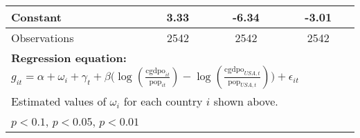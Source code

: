 \begin{sidewaystable}[htbp]
\begin{tabular}{l*{3}{c}}
Constant        &     3.33\sym{***}&    -6.34\sym{***}&    -3.01         \\
\midrule
Observations    &     2542         &     2542         &     2542         \\
\bottomrule
\multicolumn{4}{l}{\footnotesize \textbf{Regression equation:} \(g_{it} = \alpha  + \omega_i + \gamma_t + \beta \big(\log (\frac{\textrm{cgdpo}_{it}}{\textrm{pop}_{it}} ) - \log (\frac{\textrm{cgdpo}_{USA,t}}{\textrm{pop}_{USA,t}}  ) \big) + \epsilon_{it}\)}\\
\multicolumn{4}{l}{\footnotesize Estimated values of \(\omega_i\) for each country \(i\) shown above.}\\
\multicolumn{4}{l}{\footnotesize \sym{*} \(p<0.1\), \sym{**} \(p<0.05\), \sym{***} \(p<0.01\)}\\
\end{tabular}
\end{sidewaystable}
